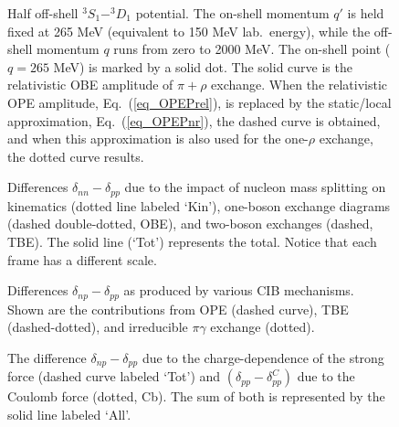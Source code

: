 

\begin{figure}
\hspace*{2.0cm}
\vspace*{-3.0cm}
\caption{Half off-shell $^3S_1$$-$$^3D_1$ potential.
The on-shell momentum $q'$ is held fixed at 265 MeV
(equivalent to 150 MeV lab.\ energy),
while the off-shell momentum $q$ runs from zero
to 2000 MeV.
The on-shell point ($q=265$ MeV) is marked by a solid dot.
The solid curve is the relativistic OBE amplitude of $\pi
+ \rho$ exchange.
When the relativistic
OPE amplitude, Eq.~(\ref{eq_OPEPrel}), is replaced by the static/local
approximation, Eq.~(\ref{eq_OPEPnr}),
the dashed curve is obtained, and
when this approximation is also used for the one-$\rho$
exchange, the dotted curve results.}
\label{fig_pot3SD1}
\end{figure}


\pagebreak



\begin{figure}
\vspace*{-3.0cm}
\hspace*{-1.7cm}
\vspace*{-3.0cm}
\caption{
Differences $\delta_{nn} - \delta_{pp}$ 
due to the impact of
nucleon mass splitting on kinematics (dotted line labeled `Kin'),
one-boson exchange diagrams (dashed double-dotted, OBE), 
and two-boson exchanges (dashed, TBE). The solid line (`Tot') represents
the total. Notice that each frame has a different scale.}
\label{fig_CSB}
\end{figure}


\pagebreak


\begin{figure}
\vspace*{-3.0cm}
\hspace*{-1.7cm}
\vspace*{-3.0cm}
\caption{
Differences 
$\delta_{np} - \delta_{pp}$ 
as produced by various CIB mechanisms.
Shown are the contributions from OPE (dashed curve),
TBE (dashed-dotted), and irreducible $\pi\gamma$ exchange (dotted).}
\label{fig_CIB1}
\end{figure}


\pagebreak

\begin{figure}
\vspace*{-3.0cm}
\hspace*{-1.7cm}
\vspace*{-3.0cm}
\caption{
The difference 
$\delta_{np} - \delta_{pp}$ 
due to the charge-dependence of the strong force (dashed curve labeled `Tot')
and $(\delta_{pp}-\delta_{pp}^C)$
due to the Coulomb force (dotted, Cb). The sum of both is represented
by the solid line labeled `All'.}
\label{fig_CIB2}
\end{figure}



